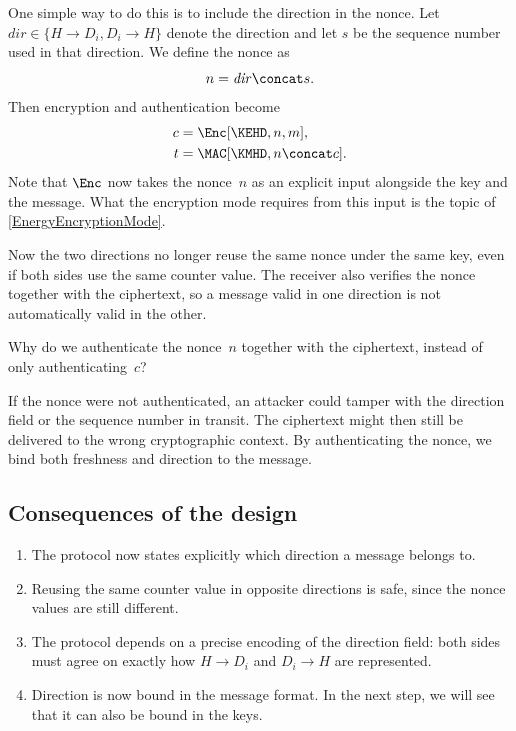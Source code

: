 One simple way to do this is to include the direction in the nonce.
Let \(\mathit{dir} \in \{H \rightarrow D_i, D_i \rightarrow H\}\) denote the
direction and let \(s\) be the sequence number used in that direction.
We define the nonce as
\[
  n = \mathit{dir} \concat s.
\]
Then encryption and authentication become
\begin{align*}
  c &= \Enc[\KEHD, n, m], \\
  t &= \MAC[\KMHD, n \concat c].
\end{align*}
Note that \(\Enc\) now takes the nonce~\(n\) as an explicit input alongside
the key and the message.
What the encryption mode requires from this input is the topic of
\cref{EnergyEncryptionMode}.

Now the two directions no longer reuse the same nonce under the same key,
even if both sides use the same counter value.
The receiver also verifies the nonce together with the ciphertext, so a
message valid in one direction is not automatically valid in the other.

\begin{exercise}
  Why do we authenticate the nonce~\(n\) together with the ciphertext,
  instead of only authenticating~\(c\)?
\end{exercise}

If the nonce were not authenticated, an attacker could tamper with the
direction field or the sequence number in transit.
The ciphertext might then still be delivered to the wrong cryptographic
context.
By authenticating the nonce, we bind both freshness and direction to the
message.

\subsection{Consequences of the design}

\begin{enumerate}
  \item The protocol now states explicitly which direction a message belongs
    to.
  \item Reusing the same counter value in opposite directions is safe, since
    the nonce values are still different.
  \item The protocol depends on a precise encoding of the direction field:
    both sides must agree on exactly how \(H \rightarrow D_i\) and
    \(D_i \rightarrow H\) are represented.
  \item Direction is now bound in the message format.
    In the next step, we will see that it can also be bound in the keys.
\end{enumerate}


